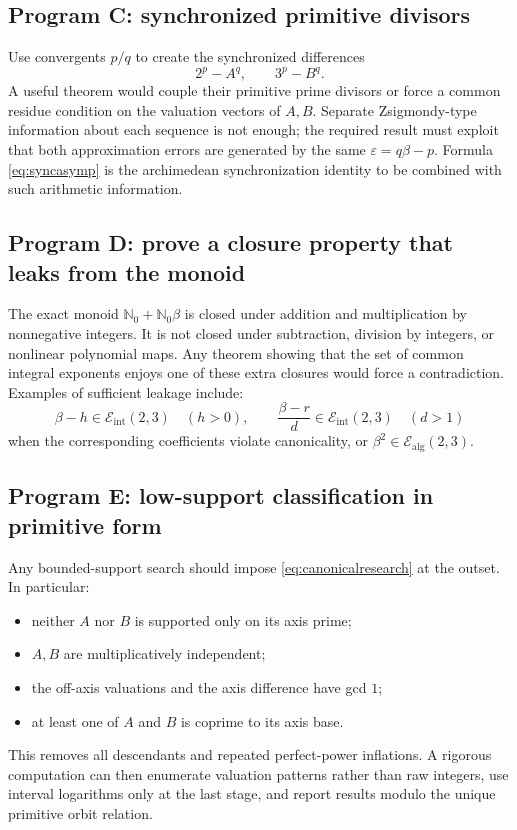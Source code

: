 \documentclass[11pt]{article}
\numberwithin{equation}{section}
\theoremstyle{definition}
\newcommand{\N}{\mathbb{N}}
\newcommand{\Ealg}{\mathcal E_{\mathrm{alg}}}
\newcommand{\Eint}{\mathcal E_{\mathrm{int}}}
\begin{document}
\subsection{Program C: synchronized primitive divisors}

Use convergents \(p/q\) to create the synchronized differences
\[
       2^p-A^q,
       \qquad
       3^p-B^q.
\]
A useful theorem would couple their primitive prime divisors or force a common residue condition on the valuation vectors of \(A,B\). Separate Zsigmondy-type information about each sequence is not enough; the required result must exploit that both approximation errors are generated by the same \(\varepsilon=q\beta-p\). Formula \eqref{eq:syncasymp} is the archimedean synchronization identity to be combined with such arithmetic information.

\subsection{Program D: prove a closure property that leaks from the monoid}

The exact monoid \(\N_0+\N_0\beta\) is closed under addition and multiplication by nonnegative integers. It is not closed under subtraction, division by integers, or nonlinear polynomial maps. Any theorem showing that the set of common integral exponents enjoys one of these extra closures would force a contradiction. Examples of sufficient leakage include:
\[
       \beta-h\in\Eint(2,3)\quad(h>0),
       \qquad
       \frac{\beta-r}{d}\in\Eint(2,3)\quad(d>1)
\]
when the corresponding coefficients violate canonicality, or \(\beta^2\in\Ealg(2,3)\).

\subsection{Program E: low-support classification in primitive form}

Any bounded-support search should impose \eqref{eq:canonicalresearch} at the outset. In particular:
\begin{itemize}
\item neither \(A\) nor \(B\) is supported only on its axis prime;
\item \(A,B\) are multiplicatively independent;
\item the off-axis valuations and the axis difference have gcd \(1\);
\item at least one of \(A\) and \(B\) is coprime to its axis base.
\end{itemize}
This removes all descendants and repeated perfect-power inflations. A rigorous computation can then enumerate valuation patterns rather than raw integers, use interval logarithms only at the last stage, and report results modulo the unique primitive orbit relation.
\end{document}
